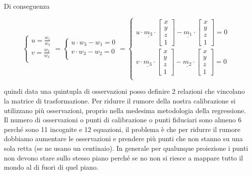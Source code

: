 Di conseguenza

$$\begin{cases}
    u = \frac{w_1}{w_3}\\
    v = \frac{w_2}{w_3}\\
\end{cases} = \begin{cases}
    u \cdot w_3 - w_1 = 0\\
    v \cdot w_3 - w_2 = 0\\
\end{cases} = \begin{cases}
    u \cdot \underline{m_3} \cdot \left[\begin{array}{c}
        x\\y\\z\\1
    \end{array}\right] - \underline{m_1} \cdot \left[\begin{array}{c}
        x\\y\\z\\1
    \end{array}\right] = 0\\
    v \cdot \underline{m_3} \cdot \left[\begin{array}{c}
        x\\y\\z\\1
    \end{array}\right] - \underline{m_2} \cdot \left[\begin{array}{c}
        x\\y\\z\\1
    \end{array}\right] = 0\\
\end{cases}   $$

quindi data una quintupla di osservazioni posso definire 2 relazioni che vincolano 
la matrice di trasformazione. Per ridurre il rumore della nostra calibrazione si 
utilizzano più osservazioni, proprio nella medesima metodologia della regressione.
Il numero di osservazioni o punti di calibrazione o punti fiduciari sono almeno $6$ perché sono 
11 incognite e 12 equazioni, il problema è che per ridurre il rumore dobbiamo 
aumentare le osservazioni e prendere più punti che non stanno su una sola retta (se ne 
usano un centinaio). In generale per qualunque proiezione i punti non devono stare 
sullo stesso piano perché se no non si riesce a mappare tutto il mondo al di fuori 
di quel piano.

